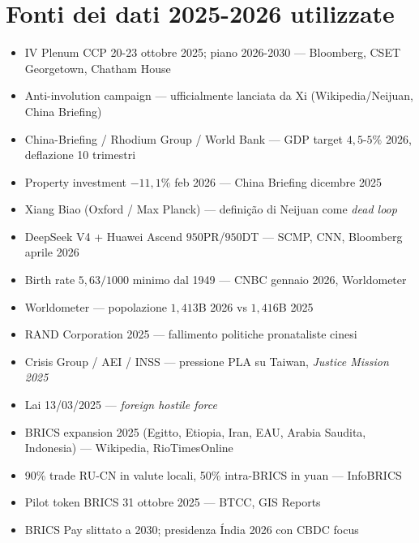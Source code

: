 \section{Fonti dei dati 2025-2026
utilizzate}\label{fonti-dei-dati-2025-2026-utilizzate}

\begin{itemize}
\tightlist
\item
  IV Plenum CCP 20-23 ottobre 2025; piano 2026-2030 --- Bloomberg, CSET
  Georgetown, Chatham House
\item
  Anti-involution campaign --- ufficialmente lanciata da Xi
  (Wikipedia/Neijuan, China Briefing)
\item
  China-Briefing / Rhodium Group / World Bank --- GDP target
  \(4{,}5\)-\(5\%\) 2026, deflazione 10 trimestri
\item
  Property investment \(-11{,}1\%\) feb 2026 --- China Briefing dicembre
  2025
\item
  Xiang Biao (Oxford / Max Planck) --- definição di Neijuan come
  \emph{dead loop}
\item
  DeepSeek V4 + Huawei Ascend \(950\)PR/\(950\)DT --- SCMP, CNN,
  Bloomberg aprile 2026
\item
  Birth rate \(5{,}63/1000\) minimo dal 1949 --- CNBC gennaio 2026,
  Worldometer
\item
  Worldometer --- popolazione \(1{,}413\)B 2026 vs \(1{,}416\)B 2025
\item
  RAND Corporation 2025 --- fallimento politiche pronataliste cinesi
\item
  Crisis Group / AEI / INSS --- pressione PLA su Taiwan, \emph{Justice
  Mission 2025}
\item
  Lai 13/03/2025 --- \emph{foreign hostile force}
\item
  BRICS expansion 2025 (Egitto, Etiopia, Iran, EAU, Arabia Saudita,
  Indonesia) --- Wikipedia, RioTimesOnline
\item
  90\% trade RU-CN in valute locali, 50\% intra-BRICS in yuan ---
  InfoBRICS
\item
  Pilot token BRICS 31 ottobre 2025 --- BTCC, GIS Reports
\item
  BRICS Pay slittato a 2030; presidenza Índia 2026 con CBDC focus
\end{itemize}



